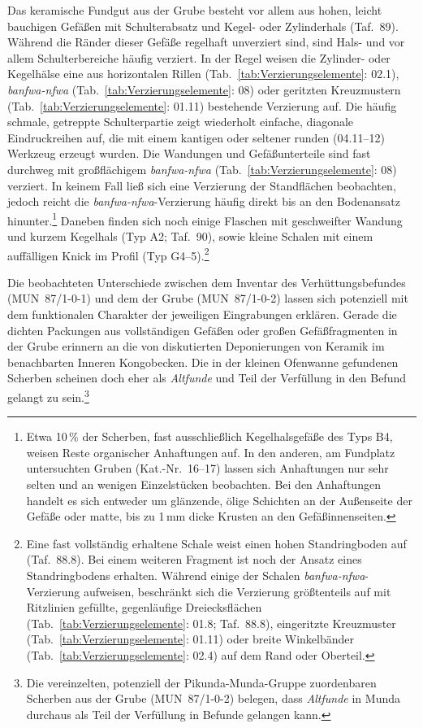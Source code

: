 Das keramische Fundgut aus der Grube besteht vor allem aus hohen, leicht bauchigen Gefäßen mit Schulterabsatz und Kegel- oder Zylinderhals (Taf.~89). Während die Ränder dieser Gefäße regelhaft unverziert sind, sind Hals- und vor allem Schulterbereiche häufig verziert. In der Regel weisen die Zylinder- oder Kegelhälse eine aus horizontalen Rillen (Tab.~\ref{tab:Verzierungselemente}: 02.1), \textit{banfwa-nfwa} (Tab.~\ref{tab:Verzierungselemente}: 08) oder geritzten Kreuzmustern (Tab.~\ref{tab:Verzierungselemente}: 01.11) bestehende Verzierung auf. Die häufig schmale, getreppte Schulterpartie zeigt wiederholt einfache, diagonale Eindruckreihen auf, die mit einem kantigen oder seltener runden (04.11--12) Werkzeug erzeugt wurden. Die Wandungen und Gefäßunterteile sind fast durchweg mit großflächigem \textit{banfwa-nfwa} (Tab.~\ref{tab:Verzierungselemente}: 08) verziert. In keinem Fall ließ sich eine Verzierung der Standflächen beobachten, jedoch reicht die \textit{banfwa-nfwa}-Verzierung häufig direkt bis an den Bodenansatz hinunter.\footnote{Etwa 10\,\% der Scherben, fast ausschließlich Kegelhalsgefäße des Typs B4, weisen Reste organischer Anhaftungen auf. In den anderen, am Fundplatz untersuchten Gruben (Kat.-Nr.~16--17) lassen sich Anhaftungen nur sehr selten und an wenigen Einzelstücken beobachten. Bei den Anhaftungen handelt es sich entweder um glänzende, ölige Schichten an der Außenseite der Gefäße oder matte, bis zu 1\,mm dicke Krusten an den Gefäßinnenseiten.} Daneben finden sich noch einige Flaschen mit geschweifter Wandung und kurzem Kegelhals (Typ A2; Taf.~90), sowie kleine Schalen mit einem auffälligen Knick im Profil (Typ G4--5).\footnote{Eine fast vollständig erhaltene Schale weist einen hohen Standringboden auf (Taf.~88.8). Bei einem weiteren Fragment ist noch der Ansatz eines Standringbodens erhalten. Während einige der Schalen \textit{banfwa-nfwa}-Verzierung aufweisen, beschränkt sich die Verzierung größtenteils auf mit Ritzlinien gefüllte, gegenläufige Dreiecksflächen (Tab.~\ref{tab:Verzierungselemente}: 01.8; Taf.~88.8), eingeritzte Kreuzmuster (Tab.~\ref{tab:Verzierungselemente}: 01.11) oder breite Winkelbänder (Tab.~\ref{tab:Verzierungselemente}: 02.4) auf dem Rand oder Oberteil.} 

Die beobachteten Unterschiede zwischen dem Inventar des Verhüttungsbefundes (MUN~87/1-0-1) und dem der Grube (MUN~87/1-0-2) lassen sich potenziell mit dem funktionalen Charakter der jeweiligen Eingrabungen erklären. Gerade die dichten Packungen aus vollständigen Gefäßen oder großen Gefäßfragmenten in der Grube erinnern an die von \textcite{Wotzka.1993} diskutierten Deponierungen von Keramik im benachbarten Inneren Kongobecken. Die in der kleinen Ofenwanne gefundenen Scherben scheinen doch eher als \textit{Altfunde} und Teil der Verfüllung in den Befund gelangt zu sein.\footnote{Die vereinzelten, potenziell der Pikunda-Munda-Gruppe zuordenbaren Scherben aus der Grube (MUN~87/1-0-2) belegen, dass \textit{Altfunde} in Munda durchaus als Teil der Verfüllung in Befunde gelangen kann.}

